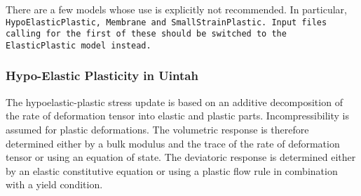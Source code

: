 There are a few models whose use is explicitly not recommended.  In particular,
\tt HypoElasticPlastic, Membrane and SmallStrainPlastic. \normalfont  Input
files calling for the first of these should be switched to the
\tt ElasticPlastic \normalfont model instead.

\subsubsection{Hypo-Elastic Plasticity in Uintah}  \label{Sec:ElasticPlastic}

The hypoelastic-plastic stress update is based on an additive
decomposition of the rate of deformation tensor into elastic
and plastic parts.  Incompressibility is assumed
for plastic deformations.  The volumetric response is therefore
determined either by a bulk modulus and the trace of the rate
of deformation tensor or using an equation of state.  The
deviatoric response is determined either by an elastic constitutive
equation or using a plastic flow rule in combination with a
yield condition.

